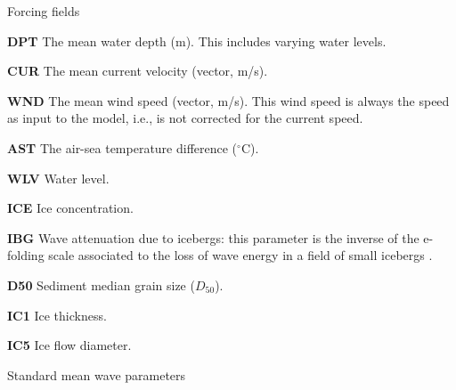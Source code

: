 \begin{list}{)\hfill}
            { \leftmargin 7mm 
             \rightmargin 0mm \itemsep \baselineskip \parsep 0mm}

\item {Forcing fields}

\begin{list}{)\hfill}
            { \leftmargin 8mm 
             \rightmargin 0mm \itemsep 0mm \parsep 0mm}
\item \textbf{DPT} The mean water depth (m). This includes varying water levels. 
\item \textbf{CUR} The mean current velocity (vector, m/s).
\item \textbf{WND} The mean wind speed (vector, m/s). This wind speed is always the
      speed as input to the model, i.e., is not corrected for the current
      speed.
\item \textbf{AST} The air-sea temperature difference ($^\circ$C).
\item \textbf{WLV} Water level.
\item \textbf{ICE} Ice concentration.
\item \textbf{IBG} Wave attenuation due to icebergs: this parameter is the inverse of the
  e-folding scale associated to the loss of wave energy in a field of small
  icebergs \citep{art:Aea11}.
\item \textbf{D50} Sediment median grain size ($D_{50}$). 
\item \textbf{IC1} Ice thickness. 
\item \textbf{IC5} Ice flow diameter. 
\end{list}

\item{Standard mean wave parameters}


\end{list}
